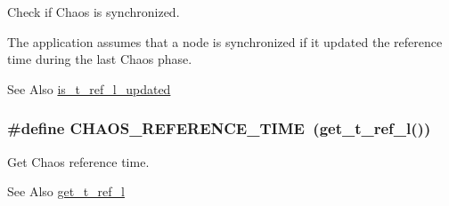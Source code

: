 Check if Chaos is synchronized. 

The application assumes that a node is synchronized if it updated the reference time during the last Chaos phase. \begin{DoxySeeAlso}{See Also}
\hyperlink{group__chaos__sync_gae7e475746ec86ae6dd8ca9ece642faf8}{is\-\_\-t\-\_\-ref\-\_\-l\-\_\-updated} 
\end{DoxySeeAlso}
\hypertarget{group__chaos-test-defines_ga034934dede09c474ca85417c4794cb51}{
\subsubsection[{C\-H\-A\-O\-S\-\_\-\-R\-E\-F\-E\-R\-E\-N\-C\-E\-\_\-\-T\-I\-M\-E}]{\setlength{\rightskip}{0pt plus 5cm}\#define C\-H\-A\-O\-S\-\_\-\-R\-E\-F\-E\-R\-E\-N\-C\-E\-\_\-\-T\-I\-M\-E~({\bf get\-\_\-t\-\_\-ref\-\_\-l}())}}\label{group__chaos-test-defines_ga034934dede09c474ca85417c4794cb51}


Get Chaos reference time. 

\begin{DoxySeeAlso}{See Also}
\hyperlink{group__chaos__sync_gaa37a5474c90f7747d0f5054dc1a03764}{get\-\_\-t\-\_\-ref\-\_\-l} 
\end{DoxySeeAlso}

